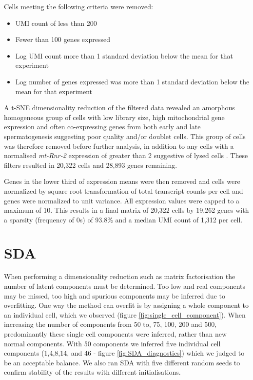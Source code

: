Cells meeting the following criteria were removed:
\begin{itemize}
\item UMI count of less than 200
\item Fewer than 100 genes expressed
\item Log UMI count more than 1 standard deviation below the mean for that experiment
\item Log number of genes expressed was more than 1 standard deviation below the mean for that experiment
\end{itemize}

A t-SNE dimensionality reduction of the filtered data revealed an amorphous homogeneous group of cells with low library size, high mitochondrial gene expression and often co-expressing genes from both early and late spermatogenesis suggesting poor quality and/or doublet cells.
This group of cells was therefore removed before further analysis, in addition to any cells with a normalised \textit{mt-Rnr-2} expression of greater than 2 suggestive of lysed cells \parencite{Ilicic2016Classification}.
These filters resulted in 20,322 cells and 28,893 genes remaining.

Genes in the lower third of expression means were then removed and cells were normalized by square root transformation of total transcript counts per cell and genes were normalized to unit variance.
All expression values were capped to a maximum of 10.
This results in a final matrix of 20,322 cells by 19,262 genes with a sparsity (frequency of 0s) of 93.8\% and a median UMI count of 1,312 per cell.


\section{SDA}

When performing a dimensionality reduction such as matrix factorisation the number of latent components must be determined.
Too low and real components may be missed, too high and spurious components may be inferred due to overfitting.
One way the method can overfit is by assigning a whole component to an individual cell, which we observed (figure \ref{fig:single_cell_component}).
When increasing the number of components from 50 to, 75, 100, 200 and 500, predominantly these single cell components were inferred, rather than new normal components.
With 50 components we inferred five individual cell components (1,4,8,14, and 46 - figure \ref{fig:SDA_diagnostics}) which we judged to be an acceptable balance.
We also ran SDA with five different random seeds to confirm stability of the results with different initialisations.

